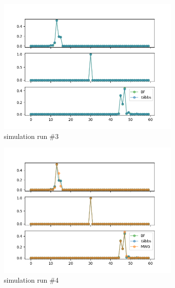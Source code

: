 \begin{figure}[H]
\begin{subfigure}{.3\textwidth}
	    \centering
    	\includegraphics[width=\linewidth]{../../plots/Posterior_post_burnin_M4_N60_NMCMC3_seed2_diffind2.png}
    	\caption{simulation run \#3}
	\end{subfigure}
	\begin{subfigure}{.3\textwidth}
	    \centering
    	\includegraphics[width=\linewidth]{../../plots/Posterior_post_burnin_M4_N60_NMCMC3_seed3_diffind2.png}
    	\caption{simulation run \#4}
	\end{subfigure}
	\begin{subfigure}{.3\textwidth}
	    \centering

\end{subfigure}
\end{figure}

